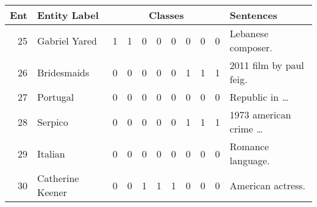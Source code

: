 \begin{tabular}{ r l r r r r r r r r l }
    \toprule
    
    \multicolumn{1}{c}{\textbf{Ent}} &
    \multicolumn{1}{l}{\textbf{Entity Label}} &
    \multicolumn{8}{c}{\textbf{Classes}} &
    \multicolumn{1}{l}{\textbf{Sentences}} \\
    
    \midrule

    25 & Gabriel Yared    & 1 & 1 & 0 & 0 & 0 & 0 & 0 & 0 & Lebanese composer.        \\
    26 & Bridesmaids      & 0 & 0 & 0 & 0 & 0 & 1 & 1 & 1 & 2011 film by paul feig.   \\
    27 & Portugal         & 0 & 0 & 0 & 0 & 0 & 0 & 0 & 0 & Republic in \dots         \\
    28 & Serpico          & 0 & 0 & 0 & 0 & 0 & 1 & 1 & 1 & 1973 american crime \dots \\
    29 & Italian          & 0 & 0 & 0 & 0 & 0 & 0 & 0 & 0 & Romance language.         \\
    30 & Catherine Keener & 0 & 0 & 1 & 1 & 1 & 0 & 0 & 0 & American actress.         \\
    
    \bottomrule
\end{tabular}
